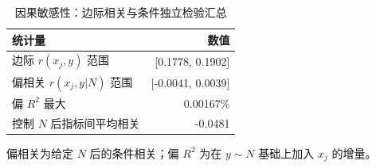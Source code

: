 \begin{table}[htbp]
\centering
\caption{因果敏感性：边际相关与条件独立检验汇总}
\label{tab:causalsummary}
\small
\begin{tabular}{lr}
\toprule
统计量 & 数值 \\
\midrule
边际 $r(x_j,y)$ 范围 & [0.1778, 0.1902] \\
偏相关 $r(x_j,y|N)$ 范围 & [-0.0041, 0.0039] \\
偏 $R^2$ 最大 & 0.00167\% \\
控制 $N$ 后指标间平均相关 & -0.0481 \\
\bottomrule
\end{tabular}
\par\vspace{2pt}\footnotesize 偏相关为给定 $N$ 后的条件相关；偏 $R^2$ 为在 $y\sim N$ 基础上加入 $x_j$ 的增量。
\end{table}
